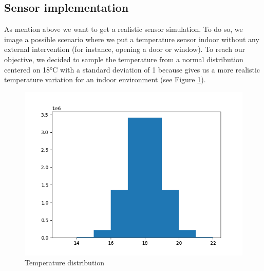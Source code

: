 \subsection{Sensor implementation}
As mention above we want to get a realistic sensor simulation. To do so, we image a possible scenario where we put a temperature sensor indoor without any external intervention (for instance, opening a door or window). To reach our objective, we decided to sample the temperature from a normal distribution centered on 18°C with a standard deviation of 1 because gives us a more realistic temperature variation for an indoor environment (see Figure \ref{fig:temp-distribution}).

\begin{figure}[h]
    \centering
    \includegraphics[width=.48\textwidth]{imgs/temp-distribution.png}
    \caption{Temperature distribution}
    \label{fig:temp-distribution}
\end{figure}
